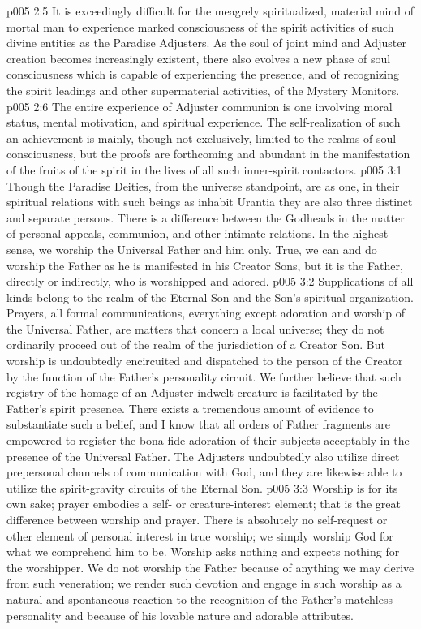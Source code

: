 \vs p005 2:5 It is exceedingly difficult for the meagrely spiritualized, material mind of mortal man to experience marked consciousness of the spirit activities of such divine entities as the Paradise Adjusters. As the soul of joint mind and Adjuster creation becomes increasingly existent, there also evolves a new phase of soul consciousness which is capable of experiencing the presence, and of recognizing the spirit leadings and other supermaterial activities, of the Mystery Monitors.
\vs p005 2:6 The entire experience of Adjuster communion is one involving moral status, mental motivation, and spiritual experience. The self\hyp{}realization of such an achievement is mainly, though not exclusively, limited to the realms of soul consciousness, but the proofs are forthcoming and abundant in the manifestation of the fruits of the spirit in the lives of all such inner\hyp{}spirit contactors.
\vs p005 3:1 Though the Paradise Deities, from the universe standpoint, are as one, in their spiritual relations with such beings as inhabit Urantia they are also three distinct and separate persons. There is a difference between the Godheads in the matter of personal appeals, communion, and other intimate relations. In the highest sense, we worship the Universal Father and him only. True, we can and do worship the Father as he is manifested in his Creator Sons, but it is the Father, directly or indirectly, who is worshipped and adored.
\vs p005 3:2 Supplications of all kinds belong to the realm of the Eternal Son and the Son’s spiritual organization. Prayers, all formal communications, everything except adoration and worship of the Universal Father, are matters that concern a local universe; they do not ordinarily proceed out of the realm of the jurisdiction of a Creator Son. But worship is undoubtedly encircuited and dispatched to the person of the Creator by the function of the Father’s personality circuit. We further believe that such registry of the homage of an Adjuster\hyp{}indwelt creature is facilitated by the Father’s spirit presence. There exists a tremendous amount of evidence to substantiate such a belief, and I know that all orders of Father fragments are empowered to register the bona fide adoration of their subjects acceptably in the presence of the Universal Father. The Adjusters undoubtedly also utilize direct prepersonal channels of communication with God, and they are likewise able to utilize the spirit\hyp{}gravity circuits of the Eternal Son.
\vs p005 3:3 Worship is for its own sake; prayer embodies a self\hyp{} or creature\hyp{}interest element; that is the great difference between worship and prayer. There is absolutely no self\hyp{}request or other element of personal interest in true worship; we simply worship God for what we comprehend him to be. Worship asks nothing and expects nothing for the worshipper. We do not worship the Father because of anything we may derive from such veneration; we render such devotion and engage in such worship as a natural and spontaneous reaction to the recognition of the Father’s matchless personality and because of his lovable nature and adorable attributes.
